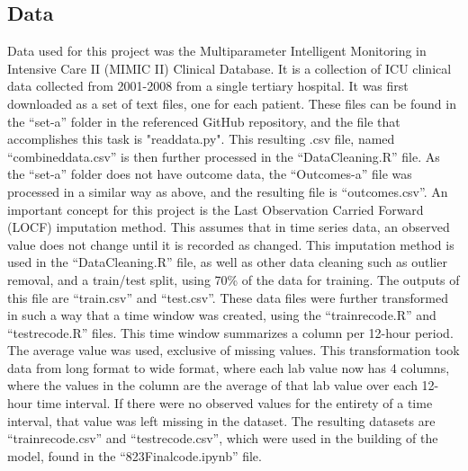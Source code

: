 \documentclass{article}
\begin{document}
\begin{multicols}{2}
\section{Data}
Data used for this project was the Multiparameter Intelligent Monitoring in Intensive Care II (MIMIC II) Clinical Database. It is a collection of ICU clinical data collected from 2001-2008 from a single tertiary hospital. It was first downloaded as a set of text files, one for each patient. These files can be found in the “set-a” folder in the referenced GitHub repository, and the file that accomplishes this task is "read\textunderscore data.py". This resulting .csv file, named “combined\textunderscore data.csv” is then further processed in the “DataCleaning.R” file. As the “set-a” folder does not have outcome data, the “Outcomes-a” file was processed in a similar way as above, and the resulting file is “outcomes.csv”. An important concept for this project is the Last Observation Carried Forward (LOCF) imputation method. This assumes that in time series data, an observed value does not change until it is recorded as changed. This imputation method is used in the “DataCleaning.R” file, as well as other data cleaning such as outlier removal, and a train/test split, using 70\% of the data for training. The outputs of this file are “train.csv” and “test.csv”. These data files were further transformed in such a way that a time window was created, using the “train\textunderscore recode.R” and “test\textunderscore recode.R” files. This time window summarizes a column per 12-hour period. The average value was used, exclusive of missing values. This transformation took data from long format to wide format, where each lab value now has 4 columns, where the values in the column are the average of that lab value over each 12-hour time interval. If there were no observed values for the entirety of a time interval, that value was left missing in the dataset. The resulting datasets are “train\textunderscore recode.csv” and “test\textunderscore recode.csv”, which were used in the building of the model, found in the “823Final\textunderscore code.ipynb” file.


\end{multicols}
\end{document}
